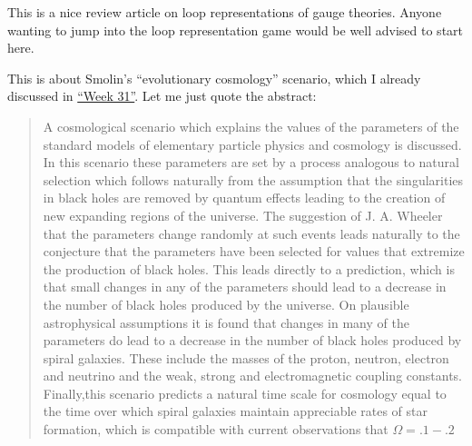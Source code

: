 \documentclass{article}
\def\tightlist{}
\renewcommand{\texttt}[1]{%
  \begingroup
  \ttfamily
  \begingroup\lccode`~=`/\lowercase{\endgroup\def~}{/\discretionary{}{}{}}%
  \begingroup\lccode`~=`[\lowercase{\endgroup\def~}{[\discretionary{}{}{}}%
  \begingroup\lccode`~=`.\lowercase{\endgroup\def~}{.\discretionary{}{}{}}%
  \catcode`/=\active\catcode`[=\active\catcode`.=\active
  \scantokens{#1\noexpand}%
  \endgroup
}
\begin{document}
\noindent
This is a nice review article on loop representations of gauge theories.
Anyone wanting to jump into the loop representation game would be well
advised to start here.

\noindent
This is about Smolin's ``evolutionary cosmology'' scenario, which I
already discussed in \protect\hyperlink{week31}{``Week 31''}. Let me
just quote the abstract:

\begin{quote}
A cosmological scenario which explains the values of the parameters of
the standard models of elementary particle physics and cosmology is
discussed. In this scenario these parameters are set by a process
analogous to natural selection which follows naturally from the
assumption that the singularities in black holes are removed by quantum
effects leading to the creation of new expanding regions of the
universe. The suggestion of J. A. Wheeler that the parameters change
randomly at such events leads naturally to the conjecture that the
parameters have been selected for values that extremize the production
of black holes. This leads directly to a prediction, which is that small
changes in any of the parameters should lead to a decrease in the number
of black holes produced by the universe. On plausible astrophysical
assumptions it is found that changes in many of the parameters do lead
to a decrease in the number of black holes produced by spiral galaxies.
These include the masses of the proton, neutron, electron and neutrino
and the weak, strong and electromagnetic coupling constants.
Finally,this scenario predicts a natural time scale for cosmology equal
to the time over which spiral galaxies maintain appreciable rates of
star formation, which is compatible with current observations that
\(\Omega = .1-.2\)
\end{quote}
\end{document}
